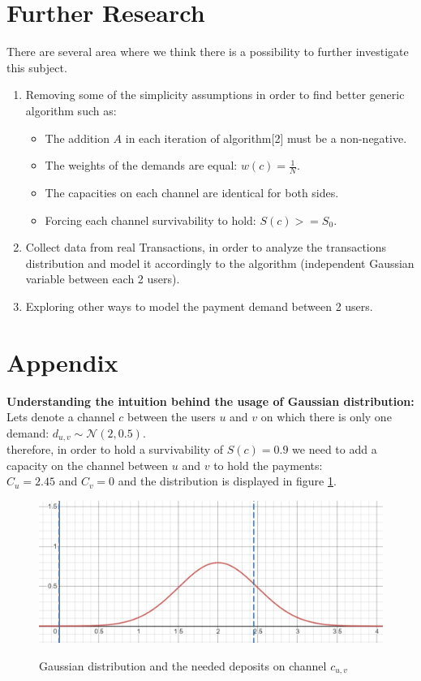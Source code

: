 \documentclass{cup-ino}
\begin{document}
\section{Further Research}
There are several area where we think there is a possibility to further investigate this subject.
\begin{enumerate}
    \item Removing some of the simplicity assumptions in order to find better generic algorithm such as:
    \begin{itemize}
        \item The addition $A$ in each iteration of algorithm[2] must be a non-negative.
        \item The weights of the demands are equal: $w(c) = \frac{1}{N}$.
        \item The capacities on each channel are identical for both sides.
        \item Forcing each channel survivability to hold: $S(c)>=S_0$.
    \end{itemize}
    \item Collect data from real Transactions, in order to analyze the transactions distribution and model it accordingly to the algorithm (independent Gaussian variable between each 2 users). 
    \item Exploring other ways to model the payment demand between 2 users.
\end{enumerate}

\newpage
\section{Appendix}
\textbf{Understanding the intuition behind the usage of Gaussian distribution:}\\
Lets denote a channel $c$ between the users $u$ and $v$ on which there is only one demand: $d_{u,v} \sim \mathcal{N}(2, 0.5) $.\\
therefore, in order to hold a survivability of $S(c) = 0.9$ we need to add a capacity on the channel between $u$ and $v$ to hold the payments:\\
$C_u = 2.45$ and $C_v=0$ and the distribution is displayed in figure \ref{fig:dist1}.
\begin{figure}[h]
\caption{Gaussian distribution and the needed deposits on channel $c_{u,v}$}
\centering
\includegraphics[scale=0.3]{Gauss_dist_1.jpeg}
\label{fig:dist1}
\end{figure}
\end{document}
